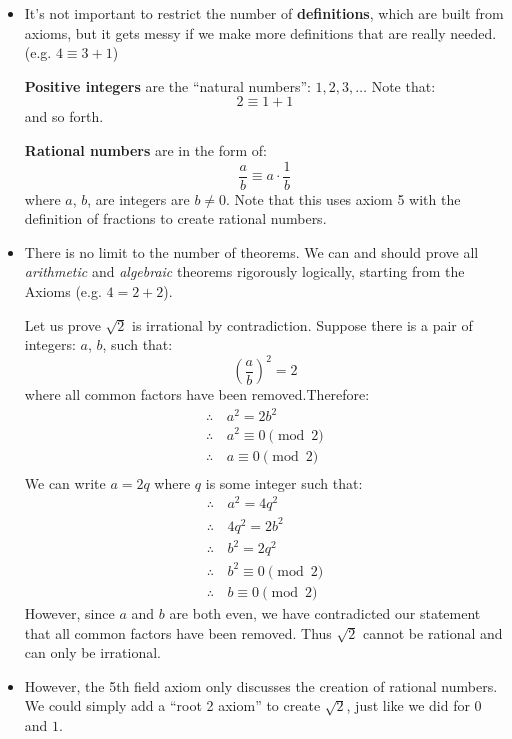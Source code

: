\begin{itemize}
\begin{enumerate}
        
    \end{enumerate}
    \item It's not important to restrict the number of \textbf{definitions}, which are built from axioms, but it gets messy if we make more definitions that are really needed. (e.g. $4 \equiv 3+1$)
    \begin{definition}
        \textbf{Positive integers} are the ``natural numbers'': $1,2,3,\dots$ Note that:
        $$2 \equiv 1+1$$
        and so forth.
    \end{definition}
    \begin{definition}
        \textbf{Rational numbers} are in the form of:
        $$\frac{a}{b} \equiv a \cdot \frac{1}{b}$$
        where $a$, $b$, are integers are $b \neq 0$. Note that this uses axiom 5 with the definition of fractions to create rational numbers.
    \end{definition}
    \item There is no limit to the number of theorems. We can and should prove all \textit{arithmetic} and \textit{algebraic} theorems rigorously logically, starting from the Axioms (e.g. $4=2+2$).
    \begin{example}
        Let us prove $\sqrt{2}$ is irrational by contradiction. Suppose there is a pair of integers: $a$, $b$, such that:
        $$\left(\frac{a}{b}\right)^2=2$$
        where all common factors have been removed.Therefore:
        \begin{align}
            \therefore\,& a^2=2b^2 \\ 
            \therefore\,&a^2 \equiv 0 \pmod{2} \\ 
            \therefore\,&a \equiv 0 \pmod{2} \\ 
        \end{align}
        We can write $a=2q$ where $q$ is some integer such that:
        \begin{align}
            \therefore\,& a^2=4q^2 \\ 
            \therefore\,& 4q^2 = 2b^2 \\ 
            \therefore\,& b^2 = 2q^2 \\ 
            \therefore\,& b^2 \equiv 0 \pmod{2} \\ 
            \therefore\,& b \equiv 0 \pmod{2}
        \end{align}
        However, since $a$ and $b$ are both even, we have contradicted our statement that all common factors have been removed. Thus $\sqrt{2}$ cannot be rational and can only be irrational.
    \end{example}
    \item However, the 5th field axiom only discusses the creation of rational numbers. We could simply add a ``root 2 axiom'' to create $\sqrt{2}$, just like we did for $0$ and $1$.
    \vspace{2mm}


\end{itemize}
